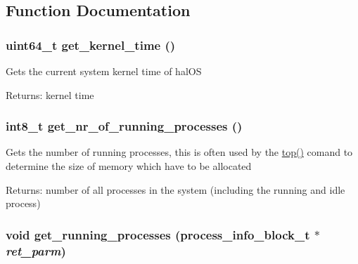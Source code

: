 \subsection{Function Documentation}
\hypertarget{group___h_s_y_s_t_e_m___a_p_i_gdbf1c32e05601efd0bc50077ef0b74d2}{
\subsubsection[{get\_\-kernel\_\-time}]{\setlength{\rightskip}{0pt plus 5cm}uint64\_\-t get\_\-kernel\_\-time ()}}
\label{group___h_s_y_s_t_e_m___a_p_i_gdbf1c32e05601efd0bc50077ef0b74d2}


Gets the current system kernel time of halOS \begin{Desc}
\item[Returns:]kernel time \end{Desc}
\hypertarget{group___h_s_y_s_t_e_m___a_p_i_gc60fbbb40b86f6d30216c28a1627dd7a}{
\subsubsection[{get\_\-nr\_\-of\_\-running\_\-processes}]{\setlength{\rightskip}{0pt plus 5cm}int8\_\-t get\_\-nr\_\-of\_\-running\_\-processes ()}}
\label{group___h_s_y_s_t_e_m___a_p_i_gc60fbbb40b86f6d30216c28a1627dd7a}


Gets the number of running processes, this is often used by the \hyperlink{group___s_c_h_e_d_u_l_e_r_g98be6cb7c674631c08f257f0f361bdba}{top()} comand to determine the size of memory which have to be allocated \begin{Desc}
\item[Returns:]number of all processes in the system (including the running and idle process) \end{Desc}
\hypertarget{group___h_s_y_s_t_e_m___a_p_i_ge906df6a1d1c0e47401b8296a8487f86}{
\subsubsection[{get\_\-running\_\-processes}]{\setlength{\rightskip}{0pt plus 5cm}void get\_\-running\_\-processes ({\bf process\_\-info\_\-block\_\-t} $\ast$ {\em ret\_\-parm})}}
\label{group___h_s_y_s_t_e_m___a_p_i_ge906df6a1d1c0e47401b8296a8487f86}


